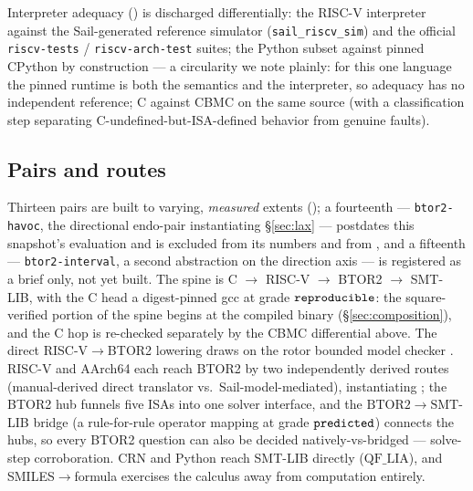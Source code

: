Interpreter adequacy () is discharged differentially:
the RISC-V interpreter against the Sail-generated reference simulator
(\texttt{sail\_riscv\_sim}) and the official \texttt{riscv-tests} /
\texttt{riscv-arch-test} suites; the Python subset against pinned
CPython by construction --- a circularity we note plainly: for this one
language the pinned runtime is both the semantics and the interpreter,
so adequacy has no independent reference; C against CBMC on the same
source (with a
classification step separating C-undefined-but-ISA-defined behavior from
genuine faults).

\subsection{Pairs and routes}
Thirteen pairs are built to varying, \emph{measured} extents
()\ifarxiv{}; a fourteenth ---
\texttt{btor2-havoc}, the
directional endo-pair instantiating \S\ref{sec:lax} --- postdates this
snapshot's evaluation and is excluded from its numbers and from
, and a fifteenth --- \texttt{btor2-interval}, a
second abstraction on the direction axis --- is registered as a brief
only, not yet built\fi. The spine is
C $\to$ RISC-V $\to$ BTOR2 $\to$ SMT-LIB, with the C head a digest-pinned
gcc at grade $\mathtt{reproducible}$: the square-verified portion of the spine begins
at the compiled binary (\S\ref{sec:composition}), and the C hop is
re-checked separately by the CBMC differential above. The direct
RISC-V$\to$BTOR2 lowering draws on the rotor bounded model checker
\citep{rotor2017basics}. RISC-V and AArch64 each reach BTOR2 by two
independently derived routes (manual-derived direct translator vs.\
Sail-model-mediated), instantiating ; the BTOR2 hub
funnels five ISAs into one solver interface, and the
$\mathrm{BTOR2}\to\mathrm{SMT}$-LIB bridge (a rule-for-rule operator
mapping at grade $\mathtt{predicted}$) connects the hubs, so every BTOR2 question can
also be decided natively-vs-bridged --- solve-step corroboration. CRN and
Python reach SMT-LIB directly ($\mathrm{QF\_LIA}$), and
SMILES$\to$formula exercises the calculus away from computation entirely.

